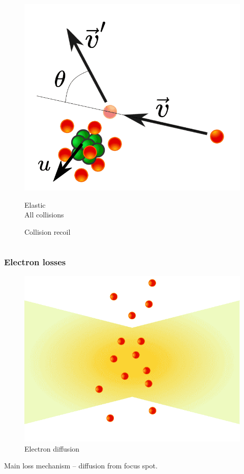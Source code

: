 \documentclass{beamer}
\begin{document}
\begin{frame}
\begin{columns}[t]
			\begin{figure}
				\centering
				\includegraphics[width=0.8\linewidth]{res/recoil_loss.png}
				\caption*{Collision recoil}
				
				Elastic\\
				All collisions
			\end{figure}
			
		\end{columns}
		
	\end{frame}
	
	\begin{frame}
		\frametitle{Electron losses}
		
		\begin{figure}
			\centering
			\includegraphics[width=0.5\linewidth]{res/diffusion.png}
			\caption*{Electron diffusion}
		\end{figure}
		
		Main loss mechanism -- diffusion from focus spot.
		
	\end{frame}
	
\end{document}
